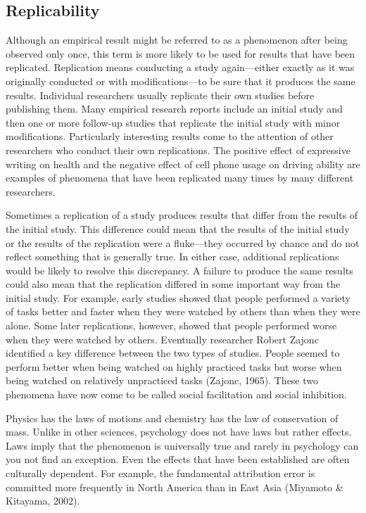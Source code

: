  \subsection{Replicability}
 Although an empirical result might be referred to as a phenomenon after being observed only once, this term is more likely to be used for results that have been replicated. Replication means conducting a study again---either exactly as it was originally conducted or with modifications---to be sure that it produces the same results. Individual researchers usually replicate their own studies before publishing them. Many empirical research reports include an initial study and then one or more follow-up studies that replicate the initial study with minor modifications. Particularly interesting results come to the attention of other researchers who conduct their own replications. The positive effect of expressive writing on health and the negative effect of cell phone usage on driving ability are examples of phenomena that have been replicated many times by many different researchers.
 
 Sometimes a replication of a study produces results that differ from the results of the initial study. This difference could mean that the results of the initial study or the results of the replication were a fluke---they occurred by chance and do not reflect something that is generally true. In either case, additional replications would be likely to resolve this discrepancy. A failure to produce the same results could also mean that the replication differed in some important way from the initial study. For example, early studies showed that people performed a variety of tasks better and faster when they were watched by others than when they were alone. Some later replications, however, showed that people performed worse when they were watched by others. Eventually researcher Robert Zajonc identified a key difference between the two types of studies. People seemed to perform better when being watched on highly practiced tasks but worse when being watched on relatively unpracticed tasks (Zajonc, 1965). These two phenomena have now come to be called social facilitation and social inhibition.
 
 Physics has the laws of motions and chemistry has the law of conservation of mass. Unlike in other sciences, psychology does not have laws but rather effects. Laws imply that the phenomenon is universally true and rarely in psychology can you not find an exception. Even the effects that have been established are often culturally dependent. For example, the fundamental attribution error is committed more frequently in North America than in East Asia (Miyamoto \& Kitayama, 2002).
 
